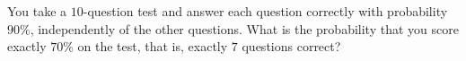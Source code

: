 You take a $10$-question test and answer each question correctly with probability $90\%$, independently of the other questions. What is the probability that you score exactly $70\%$ on the test, that is, exactly $7$ questions correct?
